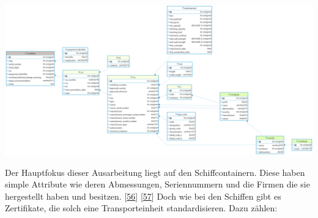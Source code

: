 \documentclass[
    headings=optiontotocandhead,%
    twoside,
    numbers=noenddot,%
    12pt, %
    titlepage, %
    parskip=full, %
    listof=leveldown, 
    numbers=noenddot, %
    a4paper,DIV=14,
    BCOR=15mm,
]{scrbook}
\let\origfigure=\figure
\let\endorigfigure=\endfigure
\renewenvironment{figure}[1][]{%
   \origfigure[H]
}{%
   \endorigfigure
}
\begin{document}
\begin{figure}
\centering
\includegraphics[width=1\textwidth,height=\textheight]{img/Schrempf/container-erd.png}
\caption{ERD der Containerdatenbank}
\end{figure}

Der Hauptfokus dieser Ausarbeitung liegt auf den Schiffcontainern. Diese
haben simple Attribute wie deren Abmessungen, Seriennummern und die
Firmen die sie hergestellt haben und besitzen.
{[}\protect\hyperlink{ref-bic-code}{56}{]}
{[}\protect\hyperlink{ref-icecargo}{57}{]} Doch wie bei den Schiffen
gibt es Zertifikate, die solch eine Transporteinheit standardisieren.
Dazu zählen:
\end{document}
